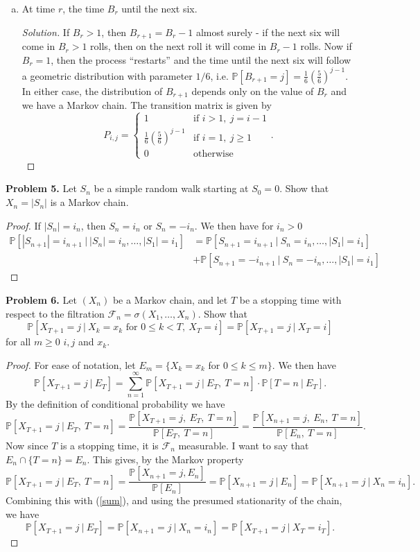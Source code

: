 \documentclass[11pt,letterpaper]{report}
\newcommand{\mcal}[1]{\mathcal{#1}}
\newcommand{\Prob}{\mathbb{P}}
\newenvironment{solution}
{\begin{proof}[Solution]}
{\end{proof}}
\begin{document}
\begin{enumerate}[(a)]
	\item At time $r$, the time $B_r$ until the next six.
	\begin{solution}
		If $B_r > 1$, then $B_{r+1} = B_r - 1$ almost surely - if the next six will come in $B_r>1$ rolls, then on the next roll it will come in $B_r-1$ rolls. Now if $B_r  = 1$, then the process ``restarts'' and the time until the next six will follow a geometric distribution with parameter $1/6$, i.e. $\Prob[B_{r+1} = j] = \frac{1}{6}(\frac{5}{6})^{j-1}$. In either case, the distribution of $B_{r+1}$ depends only on the value of $B_r$ and we have a Markov chain. The transition matrix is given by
		\[
		P_{i,j} = \begin{cases}
			1&\text{if }i>1,\ j = i-1\\
			\frac{1}{6}(\frac{5}{6})^{j-1}&\text{if }i=1,\ j\geq 1\\
			0&\text{otherwise}
		\end{cases}.
		\]
	\end{solution}
\end{enumerate}

\noindent\textbf{Problem 5. }
Let $S_n$ be a simple random walk starting at $S_0 = 0$. Show that $X_n = |S_n|$ is a Markov chain.
\begin{proof}
	If $|S_n| = i_n$, then $S_n = i_n$ or $S_n = -i_n$. We then have for $i_n > 0$
	\begin{align*}
	\Prob[|S_{n+1}| = i_{n+1}\ |\ |S_n| = i_n, \ldots, |S_1|=i_1]&= \Prob[S_{n+1} = i_{n+1}\ |\ S_n = i_n, \ldots, |S_1|=i_1]\\
	&+\Prob[S_{n+1}=-i_{n+1}\ |\ S_n = -i_n, \ldots, |S_1|=i_1]
	\end{align*}
\end{proof}

\noindent\textbf{Problem 6. }
Let $(X_n)$ be a Markov chain, and let $T$ be a stopping time with respect to the filtration $\mcal{F}_n = \sigma(X_1, \ldots, X_n)$. Show that
\[
\Prob[X_{T+1}=j\ |\ X_k = x_k\text{ for }0\leq k<T,\ X_T = i] = \Prob[X_{T+1}=j\ |\ X_T=i]
\]
for all $m\geq 0$ $i,j$ and $x_k$.
\begin{proof}
	For ease of notation, let $E_m = \{X_k = x_k$ for $0\leq k\leq m\}$. We then have
	\begin{equation}\label{sum}
	\Prob[X_{T+1} = j\ |\ E_T]= \sum_{n=1}^\infty\Prob[X_{T+1}=j\ |\ E_T,\ T=n]\cdot\Prob[T=n\ |\ E_T].
	\end{equation}
	By the definition of conditional probability we have
	\[
	\Prob[X_{T+1}=j\ |\ E_T,\ T=n] = \frac{\Prob[X_{T+1}=j,\ E_T,\ T=n]}{\Prob[E_T,\ T=n]} = \frac{\Prob[X_{n+1}=j,\ E_n,\ T=n]}{\Prob[E_n,\ T=n]}.
	\]
	Now since $T$ is a stopping time, it is $\mcal{F}_n$ measurable. I want to say that $E_n\cap \{T=n\} = E_n$. This gives, by the Markov property
	\[
	\Prob[X_{T+1}=j\ |\ E_T,\ T=n] = \frac{\Prob[X_{n+1}=j, E_n]}{\Prob[E_n]} = \Prob[X_{n+1}=j\ |\ E_n] = \Prob[X_{n+1}=j\ |\ X_n = i_n].
	\]
	Combining this with (\ref{sum}), and using the presumed stationarity of the chain, we have
	\[
	\Prob[X_{T+1} =j\ |\ E_T] = \Prob[X_{n+1}=j\ |\ X_n = i_n] = \Prob[X_{T+1}=j\ |\ X_T=i_T].
	\]
\end{proof}
\end{document}
